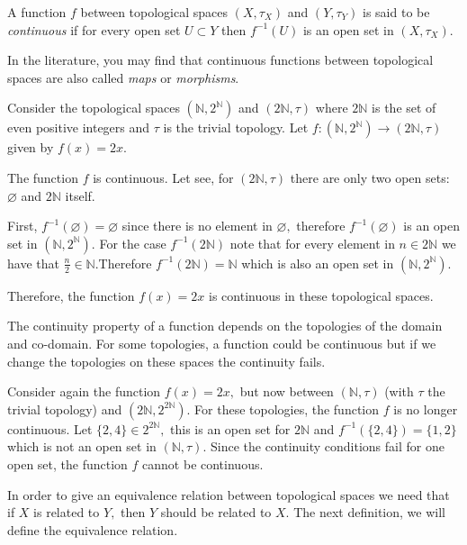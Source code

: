 \documentclass[
	fontsize=10pt, %
	twoside=false, %
	secnumdepth=1, %
]{kaobook}
\begin{document}
\begin{definition}
A function $f$ between topological spaces $(X,\tau_X)$ and $(Y,\tau_Y)$ is said to be \emph{continuous} if for every open set $U\subset Y$ then $f^{-1}(U)$ is an open set in $(X,\tau_X).$
\end{definition}

In the literature, you may find that continuous functions between topological spaces are also called \emph{maps} or \emph{morphisms}. 

\begin{example}
Consider the topological spaces $(\mathbb{N},2^{\mathbb{N}})$ and $(2\mathbb{N},\tau)$ where $2\mathbb{N}$ is the set of even positive integers and $\tau$ is the trivial topology. Let $f:(\mathbb{N},2^{\mathbb{N}})\to (2\mathbb{N},\tau)$ given by $f(x)=2x.$

The function $f$ is continuous. Let see, for $(2\mathbb{N},\tau)$ there are only two open sets: $\varnothing$ and $2\mathbb{N}$ itself. 

First, $f^{-1}(\varnothing)=\varnothing$ since there is no element in $\varnothing,$ therefore $f^{-1}(\varnothing)$ is an open set in $(\mathbb{N},2^{\mathbb{N}}).$ For the case $f^{-1}(2\mathbb{N})$ note that for every element in $n\in 2\mathbb{N}$ we have that $\frac{n}{2}\in\mathbb{N}$.Therefore $f^{-1}(2\mathbb{N})=\mathbb{N}$ which is also an open set in $(\mathbb{N},2^{\mathbb{N}}).$

Therefore, the function $f(x)=2x$ is continuous in these topological spaces.
\end{example}

The continuity property of a function depends on the topologies of the domain and co-domain. For some topologies, a function could be continuous but if we change the topologies on these spaces the continuity fails.

\begin{example}
Consider again the function $f(x)=2x,$ but now between $(\mathbb{N},\tau)$ (with $\tau$ the trivial topology) and $(2\mathbb{N},2^{2\mathbb{N}}).$ For these topologies, the function $f$ is no longer continuous. Let $\{2,4\}\in 2^{2\mathbb{N}},$ this is an open set for $2\mathbb{N}$ and $f^{-1}(\{2,4\})=\{1,2\}$ which is not an open set in $(\mathbb{N},\tau).$ Since the continuity conditions fail for one open set, the function $f$ cannot be continuous.  
\end{example}

In order to give an equivalence relation between topological spaces we need that if $X$ is related to $Y,$ then $Y$ should be related to $X.$ The next definition, we will define the equivalence relation.
\end{document}
